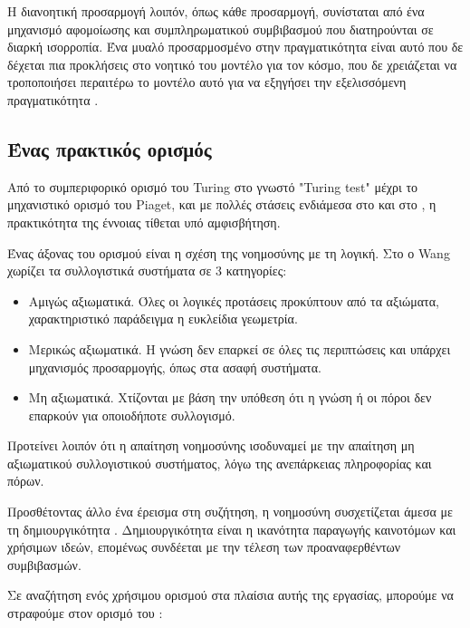   Η διανοητική προσαρμογή λοιπόν, όπως κάθε προσαρμογή, συνίσταται από ένα μηχανισμό αφομοίωσης και συμπληρωματικού συμβιβασμού που διατηρούνται σε διαρκή ισορροπία.
  Ένα μυαλό προσαρμοσμένο στην πραγματικότητα είναι αυτό που δε δέχεται πια προκλήσεις στο νοητικό του μοντέλο για τον κόσμο,
  που δε χρειάζεται να τροποποιήσει περαιτέρω το μοντέλο αυτό για να εξηγήσει την εξελισσόμενη πραγματικότητα \parencite[σελ 5-7]{piagetOriginsIntelligenceChildren1952}.

\subsection*{Ένας πρακτικός ορισμός}

  Από το συμπεριφορικό ορισμό του Turing στο γνωστό "Turing test" μέχρι το μηχανιστικό ορισμό του Piaget,
  και με πολλές στάσεις ενδιάμεσα στο \cite[Lenat][]{lenatThresholdsKnowledge1991} και στο \cite[Minsky][]{minskySocietyMind1988},
  η πρακτικότητα της έννοιας τίθεται υπό αμφισβήτηση.

  Ένας άξονας του ορισμού είναι η σχέση της νοημοσύνης με τη λογική. Στο \cite{wangCognitiveLogicMathematical}
  ο Wang χωρίζει τα συλλογιστικά συστήματα σε 3 κατηγορίες:
  \begin{itemize}
    \item Αμιγώς αξιωματικά. Όλες οι λογικές προτάσεις προκύπτουν από τα αξιώματα, χαρακτηριστικό παράδειγμα η ευκλείδια γεωμετρία.
    \item Μερικώς αξιωματικά. Η γνώση δεν επαρκεί σε όλες τις περιπτώσεις και υπάρχει μηχανισμός προσαρμογής, όπως στα ασαφή συστήματα.
    \item Μη αξιωματικά. Χτίζονται με βάση την υπόθεση ότι η γνώση ή οι πόροι δεν επαρκούν για οποιοδήποτε συλλογισμό.
  \end{itemize}

  Προτείνει λοιπόν ότι η απαίτηση νοημοσύνης ισοδυναμεί με την απαίτηση μη αξιωματικού συλλογιστικού συστήματος,
  λόγω της ανεπάρκειας πληροφορίας και πόρων.

  Προσθέτοντας άλλο ένα έρεισμα στη συζήτηση, η νοημοσύνη συσχετίζεται άμεσα με τη δημιουργικότητα \parencite{benedekIntelligenceCreativityCognitive2014}.
  Δημιουργικότητα είναι η ικανότητα παραγωγής καινοτόμων και χρήσιμων ιδεών,
  επομένως συνδέεται με την τέλεση των προαναφερθέντων συμβιβασμών.
  \bigskip

  Σε αναζήτηση ενός χρήσιμου ορισμού στα πλαίσια αυτής της εργασίας, μπορούμε να στραφούμε στον ορισμό του \cite[Wang][]{wangWorkingDefinitionIntelligence1995}:

